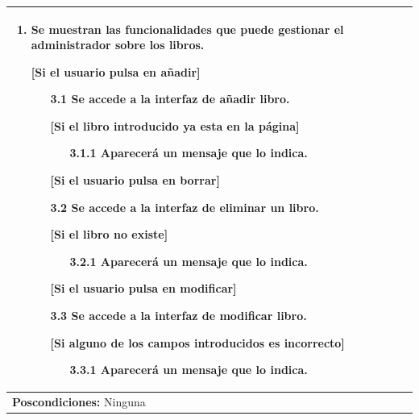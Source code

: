 \documentclass{report}
\begin{document}
\begin{center}
\begin{longtable}{|p{\linewidth}|}
\begin{enumerate}
                            \item Se muestran las funcionalidades que puede gestionar el administrador sobre los libros.
                            \item[] [Si el usuario pulsa en añadir]
                            \begin{enumerate}
                                \item[3.1] Se accede a la interfaz de añadir libro.
                                \item[] [Si el libro introducido ya esta en la página]
                                \begin{enumerate}
                                    \item[3.1.1] Aparecerá un mensaje que lo indica.
                                \end{enumerate}
                                \item[] [Si el usuario pulsa en borrar]
                                \item[3.2] Se accede a la interfaz de eliminar un libro.
                                \item[] [Si el libro no existe]
                                \begin{enumerate}
                                    \item[3.2.1] Aparecerá un mensaje que lo indica.
                                \end{enumerate}
                                \item[] [Si el usuario pulsa en modificar]
                                \item[3.3] Se accede a la interfaz de modificar libro.
                                \item[] [Si alguno de los campos introducidos es incorrecto]
                                \begin{enumerate}
                                    \item[3.3.1] Aparecerá un mensaje que lo indica.
                                \end{enumerate}
                            \end{enumerate}
                        \end{enumerate}\\
                        \hline
                        \textbf{Poscondiciones:} Ninguna\\
                        \hline

\end{longtable}
\end{center}
\end{document}

